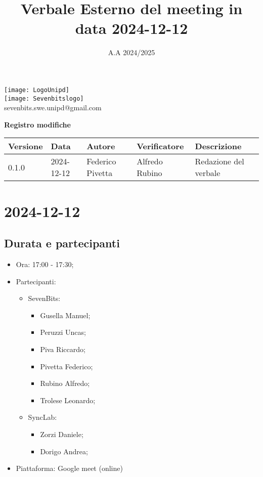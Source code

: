 \documentclass[10pt]{article}
\title{Verbale Esterno del meeting in data 2024-12-12}
\date{A.A 2024/2025}
\begin{document}
\maketitle
\begin{center}
\texttt{[image: LogoUnipd]}\\
\texttt{[image: Sevenbitslogo]}\\
sevenbits.swe.unipd@gmail.com\\
\vspace{2mm}

\textbf{Registro modifiche}\\
\vspace{2mm}
\begin{tabularx}{\textwidth}{|l|l|l|l|X|}
\hline
\textbf{Versione} & \textbf{Data} & \textbf{Autore} & \textbf{Verificatore} & \textbf{Descrizione} \\
\hline
0.1.0 & 2024-12-12 & Federico Pivetta & Alfredo Rubino & Redazione del verbale\\
\hline
\end{tabularx}
\end{center}

\newpage
\tableofcontents

\newpage
\section{2024-12-12}
\subsection{Durata e partecipanti}
\begin{itemize}
\item Ora: 17:00 - 17:30;
\item Partecipanti: 	
	\begin{itemize}
            \item SevenBits:
            \begin{itemize}
	              \item Gusella Manuel;
                    \item Peruzzi Uncas;
                    \item Piva Riccardo;
                    \item Pivetta Federico;
                    \item Rubino Alfredo;
                    \item Trolese Leonardo;
	    \end{itemize}
            \item SyncLab:
            \begin{itemize}
                \item Zorzi Daniele;
                \item Dorigo Andrea;
            \end{itemize}
        \end{itemize}
\item Piattaforma: Google meet (online)
\end{itemize}
\end{document}
